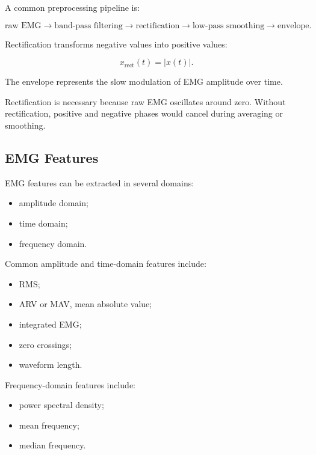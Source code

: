 A common preprocessing pipeline is:

\[
\text{raw EMG}
\rightarrow
\text{band-pass filtering}
\rightarrow
\text{rectification}
\rightarrow
\text{low-pass smoothing}
\rightarrow
\text{envelope}.
\]

Rectification transforms negative values into positive values:

\[
x_{\text{rect}}(t)
=
|x(t)|.
\]

The envelope represents the slow modulation of EMG amplitude over time.

\begin{authornote}
Rectification is necessary because raw EMG oscillates around zero. Without rectification, positive and negative phases would cancel during averaging or smoothing.
\end{authornote}

\subsection{EMG Features}

EMG features can be extracted in several domains:

\begin{itemize}[noitemsep]
    \item amplitude domain;
    \item time domain;
    \item frequency domain.
\end{itemize}

Common amplitude and time-domain features include:

\begin{itemize}[noitemsep]
    \item RMS;
    \item ARV or MAV, mean absolute value;
    \item integrated EMG;
    \item zero crossings;
    \item waveform length.
\end{itemize}

Frequency-domain features include:

\begin{itemize}[noitemsep]
    \item power spectral density;
    \item mean frequency;
    \item median frequency.
\end{itemize}

